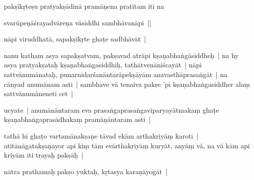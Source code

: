 \documentclass[article,12pt,a4paper]{memoir}%
\newcounter{parCount}
\begin{document}
	  
	  \pstart \leavevmode%
	pakṣīkṛteṣu pratyakṣādinā pramāṇena pratītam iti na
	{}
	\pend%
      

	  
	  \pstart \leavevmode%
	svarūpeṇāśrayadvāreṇa vāsiddhi sambhāvanāpi ||
	{}
	\pend%
      

	  
	  \pstart \leavevmode%
	\label{thakur75-67.20}nāpi viruddhatā, sapakṣīkṛte ghaṭe sadbhāvāt |
	{}
	\pend%
      

	  
	  \pstart \leavevmode%
	\label{thakur75-67.20b}nanu katham asya sapakṣatvam, pakṣavad atrāpi kṣaṇabhaṅgāsiddheḥ | na hy asya pratyakṣataḥ kṣaṇabhaṅgasiddhiḥ, tathātvenāniścayāt | nāpi sattvānumānataḥ, punarnidarśanāntarāpekṣāyām anavasthāprasaṅgāt | na cānyad anumānam asti | sambhave vā tenaiva pakṣe 'pi kṣaṇabhaṅgasiddher alaṃ sattvānumāneneti cet |
	{}
	\pend%
      

	  
	  \pstart \leavevmode%
	\label{thakur75-67.24}ucyate | anumānāntaram eva prasaṅgaprasaṅgaviparyayātmakaṃ ghaṭe kṣaṇabhaṅgaprasādhakaṃ pramāṇāntaram asti |
	{}
	\pend%
      

	  
	  \pstart \leavevmode%
	\label{thakur75-67.25}tathā hi ghaṭo vartamānakṣaṇe tāvad ekām arthakriyāṃ karoti | atītānāgatakṣaṇayor api kiṃ tām evārthakriyāṃ kuryāt, anyāṃ vā, na vā kām api kriyām iti trayaḥ pakṣāḥ |
	{}
	\pend%
      

	  
	  \pstart \leavevmode%
	\label{thakur75-68.3}nātra prathamaḥ pakṣo yuktaḥ, kṛtasya karaṇāyogāt |
	{}
	\pend%
      
\end{document}

